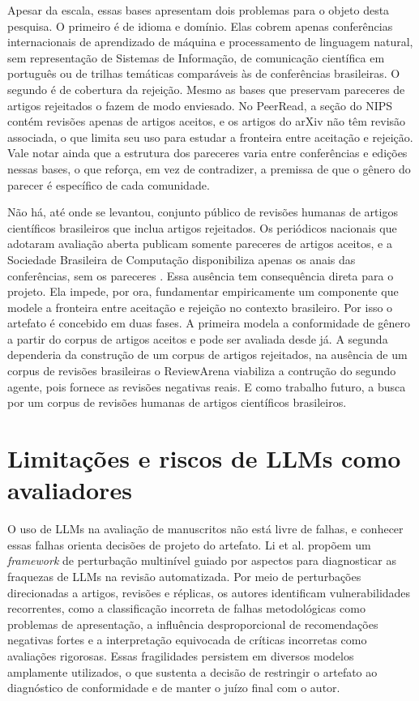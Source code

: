 Apesar da escala, essas bases apresentam dois problemas para o objeto desta pesquisa. O primeiro é de idioma e domínio. Elas cobrem apenas conferências internacionais de aprendizado de máquina e processamento de linguagem natural, sem representação de Sistemas de Informação, de comunicação científica em português ou de trilhas temáticas comparáveis às de conferências brasileiras. O segundo é de cobertura da rejeição. Mesmo as bases que preservam pareceres de artigos rejeitados o fazem de modo enviesado. No PeerRead, a seção do NIPS contém revisões apenas de artigos aceitos, e os artigos do arXiv não têm revisão associada, o que limita seu uso para estudar a fronteira entre aceitação e rejeição. Vale notar ainda que a estrutura dos pareceres varia entre conferências e edições nessas bases, o que reforça, em vez de contradizer, a premissa de que o gênero do parecer é específico de cada comunidade.

Não há, até onde se levantou, conjunto público de revisões humanas de artigos científicos brasileiros que inclua artigos rejeitados. Os periódicos nacionais que adotaram avaliação aberta publicam somente pareceres de artigos aceitos, e a Sociedade Brasileira de Computação disponibiliza apenas os anais das conferências, sem os pareceres \cite{solsbc}. Essa ausência tem consequência direta para o projeto. Ela impede, por ora, fundamentar empiricamente um componente que modele a fronteira entre aceitação e rejeição no contexto brasileiro. Por isso o artefato é concebido em duas fases. A primeira modela a conformidade de gênero a partir do corpus de artigos aceitos e pode ser avaliada desde já. 
A segunda dependeria da construção de um corpus de artigos rejeitados, na ausência de um corpus de revisões brasileiras o ReviewArena viabiliza a contrução do segundo agente, pois fornece as revisões negativas reais. E como trabalho futuro, a busca por um corpus de revisões humanas de artigos científicos brasileiros.


\section{Limitações e riscos de LLMs como avaliadores}

O uso de LLMs na avaliação de manuscritos não está livre de falhas, e conhecer essas falhas orienta decisões de projeto do artefato. Li et al.  propõem um \textit{framework} de perturbação multinível guiado por aspectos para diagnosticar as fraquezas de LLMs na revisão automatizada. Por meio de perturbações direcionadas a artigos, revisões e réplicas, os autores identificam vulnerabilidades recorrentes, como a classificação incorreta de falhas metodológicas como problemas de apresentação, a influência desproporcional de recomendações negativas fortes e a interpretação equivocada de críticas incorretas como avaliações rigorosas. Essas fragilidades persistem em diversos modelos amplamente utilizados, o que sustenta a decisão de restringir o artefato ao diagnóstico de conformidade e de manter o juízo final com o autor.


